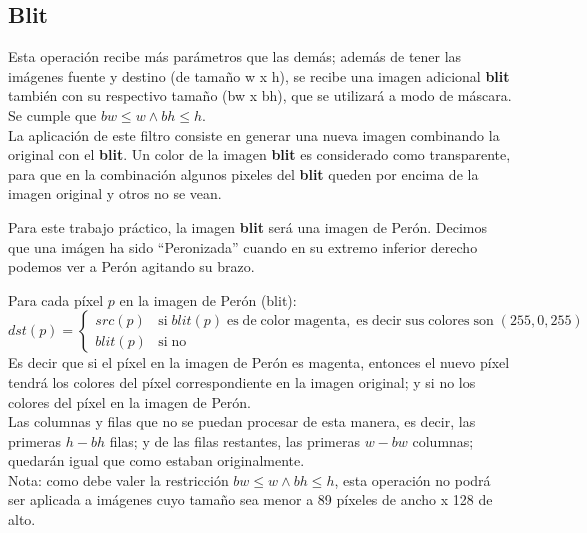 \subsection{Blit}

Esta operaci\'on recibe m\'as par\'ametros que las dem\'as; adem\'as de tener las im\'agenes fuente y destino (de tama\~no w x h), 
se recibe una imagen adicional \textbf{blit} tambi\'en con su respectivo tama\~no (bw x bh), que se utilizar\'a a modo de m\'ascara.
Se cumple que $bw \leq w \wedge bh \leq h$.\\

La aplicaci\'on de este filtro consiste en generar una nueva imagen combinando la original con el \textbf{blit}.
Un color de la imagen \textbf{blit} es considerado como transparente,
para que en la combinaci\'on algunos pixeles del \textbf{blit} queden por encima de la imagen original y otros no se vean.

Para este trabajo pr\'actico, la imagen \textbf{blit} ser\'a una imagen de Per\'on.
Decimos que una im\'agen ha sido ``Peronizada'' cuando en su extremo inferior derecho podemos ver a Per\'on agitando su brazo.

\vskip 8pt
Para cada p\'ixel $p$ en la imagen de Per\'on (blit):\\
$dst(p) = \begin{cases}
    src(p) & \mathrm{si \;} blit(p) \mathrm{\; es \; de \; color \; magenta, \; es \; decir \; sus \; colores \; son \;} (255, 0, 255)\\
    blit(p) & \mathrm{si \; no}
\end{cases}$ \\

Es decir que si el p\'ixel en la imagen de Per\'on es magenta, entonces el nuevo p\'ixel tendr\'a los colores del p\'ixel correspondiente 
en la imagen original; y si no los colores del p\'ixel en la imagen de Per\'on. \\

Las columnas y filas que no se puedan procesar de esta manera, es decir, 
las primeras $h - bh$ filas; y de las filas restantes, las primeras $w - bw$ columnas; 
quedar\'an igual que como estaban originalmente. \\

Nota: como debe valer la restricci\'on $bw \leq w \wedge bh \leq h$, esta operaci\'on 
no podr\'a ser aplicada a im\'agenes cuyo tama\~no sea menor a 89 p\'ixeles de ancho 
x 128 de alto.


